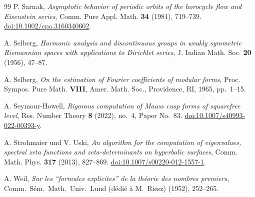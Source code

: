 \documentclass[12pt,a4paper]{article}
\theoremstyle{definition}
\theoremstyle{remark}
\begin{document}
\begin{thebibliography}{99}
P. Sarnak,
\emph{Asymptotic behavior of periodic orbits of the horocycle flow and Eisenstein series},
Comm. Pure Appl. Math. \textbf{34} (1981), 719--739.
\href{https://doi.org/10.1002/cpa.3160340602}{doi:10.1002/cpa.3160340602}.

A. Selberg,
\emph{Harmonic analysis and discontinuous groups in weakly symmetric Riemannian spaces with applications to Dirichlet series},
J. Indian Math. Soc. \textbf{20} (1956), 47--87.

A. Selberg,
\emph{On the estimation of Fourier coefficients of modular forms},
Proc. Sympos. Pure Math. \textbf{VIII}, Amer. Math. Soc., Providence, RI, 1965, pp.~1--15.

A. Seymour-Howell,
\emph{Rigorous computation of Maass cusp forms of squarefree level},
Res. Number Theory \textbf{8} (2022), no.~4, Paper No.~83.
\href{https://doi.org/10.1007/s40993-022-00393-y}{doi:10.1007/s40993-022-00393-y}.

A. Strohmaier und V. Uski,
\emph{An algorithm for the computation of eigenvalues, spectral zeta functions and zeta-determinants on hyperbolic surfaces},
Comm. Math. Phys. \textbf{317} (2013), 827--869.
\href{https://doi.org/10.1007/s00220-012-1557-1}{doi:10.1007/s00220-012-1557-1}.

A. Weil,
\emph{Sur les ``formules explicites'' de la théorie des nombres premiers},
Comm.\ Sém.\ Math.\ Univ.\ Lund (dédié à M.\ Riesz) (1952), 252--265.
\end{thebibliography}
\endgroup
\end{document}
